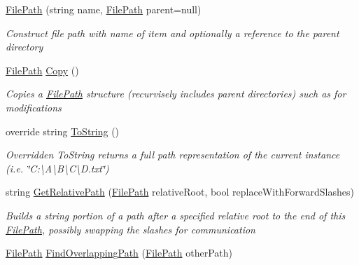 \begin{DoxyCompactItemize}
\item 
\hyperlink{class_cloud_api_public_1_1_model_1_1_file_path_a808fa118b10dc8ff0bedac77d5114353}{File\-Path} (string name, \hyperlink{class_cloud_api_public_1_1_model_1_1_file_path}{File\-Path} parent=null)
\begin{DoxyCompactList}\small\item\em Construct file path with name of item and optionally a reference to the parent directory \end{DoxyCompactList}\item 
\hyperlink{class_cloud_api_public_1_1_model_1_1_file_path}{File\-Path} \hyperlink{class_cloud_api_public_1_1_model_1_1_file_path_af5779a5ded786612570db88f1fed976d}{Copy} ()
\begin{DoxyCompactList}\small\item\em Copies a \hyperlink{class_cloud_api_public_1_1_model_1_1_file_path}{File\-Path} structure (recurvisely includes parent directories) such as for modifications \end{DoxyCompactList}\item 
override string \hyperlink{class_cloud_api_public_1_1_model_1_1_file_path_a806dd9bf2dad9a537a87330001ba0752}{To\-String} ()
\begin{DoxyCompactList}\small\item\em Overridden To\-String returns a full path representation of the current instance (i.\-e. \char`\"{}\-C\-:\textbackslash{}\-A\textbackslash{}\-B\textbackslash{}\-C\textbackslash{}\-D.\-txt\char`\"{}) \end{DoxyCompactList}\item 
string \hyperlink{class_cloud_api_public_1_1_model_1_1_file_path_a695712bfd6b6293199e04085b04e2f50}{Get\-Relative\-Path} (\hyperlink{class_cloud_api_public_1_1_model_1_1_file_path}{File\-Path} relative\-Root, bool replace\-With\-Forward\-Slashes)
\begin{DoxyCompactList}\small\item\em Builds a string portion of a path after a specified relative root to the end of this \hyperlink{class_cloud_api_public_1_1_model_1_1_file_path}{File\-Path}, possibly swapping the slashes for communication \end{DoxyCompactList}\item 
\hyperlink{class_cloud_api_public_1_1_model_1_1_file_path}{File\-Path} \hyperlink{class_cloud_api_public_1_1_model_1_1_file_path_aa9f2baee747ea9b26c875e9f572c7519}{Find\-Overlapping\-Path} (\hyperlink{class_cloud_api_public_1_1_model_1_1_file_path}{File\-Path} other\-Path)

\end{DoxyCompactItemize}
